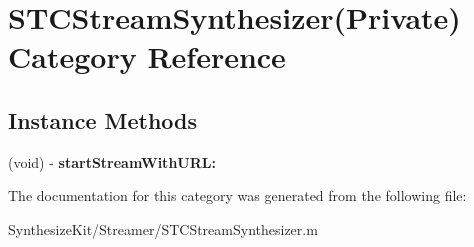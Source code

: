 \hypertarget{category_s_t_c_stream_synthesizer_07_private_08}{}\section{S\+T\+C\+Stream\+Synthesizer(Private) Category Reference}
\label{category_s_t_c_stream_synthesizer_07_private_08}
\subsection*{Instance Methods}
\begin{DoxyCompactItemize}
\item 
\hypertarget{category_s_t_c_stream_synthesizer_07_private_08_a2f6b2cba37e9c2ec89f462580a48e5cc}{}\label{category_s_t_c_stream_synthesizer_07_private_08_a2f6b2cba37e9c2ec89f462580a48e5cc} 
(void) -\/ {\bfseries start\+Stream\+With\+U\+R\+L\+:}
\end{DoxyCompactItemize}


The documentation for this category was generated from the following file\+:\begin{DoxyCompactItemize}
\item 
Synthesize\+Kit/\+Streamer/S\+T\+C\+Stream\+Synthesizer.\+m\end{DoxyCompactItemize}
